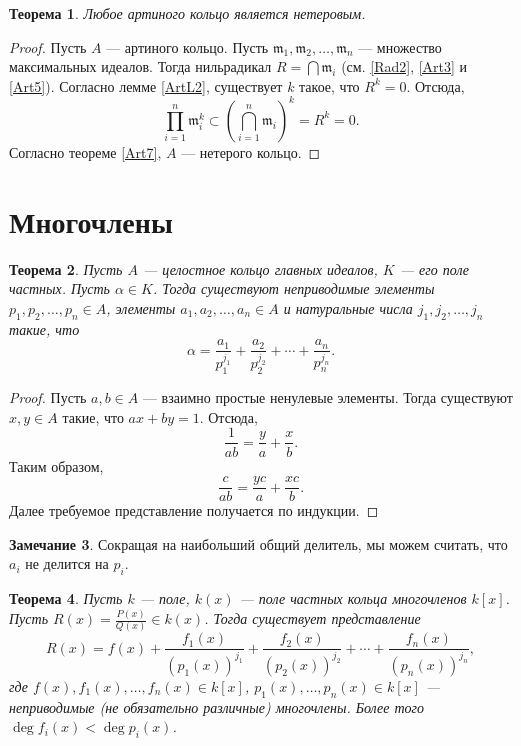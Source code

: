 \documentclass[12pt, titlepage, oneside]{amsbook}
\newcommand{\mmm}{\mathfrak{m}}
\newtheorem{theorem}{Теорема}[chapter]
\theoremstyle{definition}
\newtheorem{remark}[theorem]{Замечание}
\theoremstyle{remark}
\begin{document}
\begin{theorem}
	\label{Art8}
	Любое артиного кольцо является нетеровым.
\end{theorem}

\begin{proof}
	Пусть $A$ --- артиного кольцо. Пусть $\mmm_1,\mmm_2,\ldots,\mmm_n$ --- множество максимальных идеалов. Тогда нильрадикал $R=\bigcap\mmm_i$  (см. \ref{Rad2}, \ref{Art3} и \ref{Art5}). Согласно лемме \ref{ArtL2}, существует $k$ такое, что $R^k=0$. Отсюда, $$\prod\limits_{i=1}^n\mmm_i^k\subset\left(\bigcap\limits_{i=1}^n\mmm_i\right)^k=R^k=0.$$ Согласно теореме \ref{Art7}, $A$ --- нетерого кольцо.
\end{proof}

\section{Многочлены}


\begin{theorem}
	\label{Mn2-1}
	Пусть $A$ --- целостное кольцо главных идеалов, $K$ --- его поле частных. Пусть $\alpha\in K$. Тогда существуют неприводимые элементы $p_1,p_2,\ldots, p_n\in A$, элементы $a_1,a_2,\ldots, a_n\in A$ и натуральные числа $j_1,j_2,\ldots,j_n$ такие, что $$\alpha=\frac{a_1}{p_1^{j_1}}+\frac{a_2}{p_2^{j_2}}+\cdots+\frac{a_n}{p_n^{j_n}}.$$
\end{theorem}

\begin{proof}
	Пусть $a,b\in A$ --- взаимно простые ненулевые элементы. Тогда существуют $x,y\in A$ такие, что $ax+by=1$. Отсюда, $$\frac{1}{ab}=\frac{y}{a}+\frac{x}{b}.$$ Таким образом, $$\frac{c}{ab}=\frac{yc}{a}+\frac{xc}{b}.$$ Далее требуемое представление получается по индукции.
\end{proof}

\begin{remark}
	Сокращая на наибольший общий делитель, мы можем считать, что $a_i$ не делится на $p_i$.
\end{remark}

\begin{theorem}
	\label{Mn2-2}
	Пусть $k$ --- поле, $k(x)$ --- поле частных кольца многочленов $k[x]$. Пусть $R(x)=\frac{P(x)}{Q(x)}\in k(x)$. Тогда существует представление $$R(x)=f(x)+\frac{f_1(x)}{(p_1(x))^{j_1}}+\frac{f_2(x)}{(p_2(x))^{j_2}}+\cdots+\frac{f_n(x)}{(p_n(x))^{j_n}},$$ где $f(x),f_1(x),\ldots, f_n(x)\in k[x]$, $p_1(x),\ldots,p_n(x)\in k[x]$ --- неприводимые (не обязательно различные) многочлены. Более того $\deg f_i(x)<\deg p_i(x)$.
\end{theorem}
\end{document}

